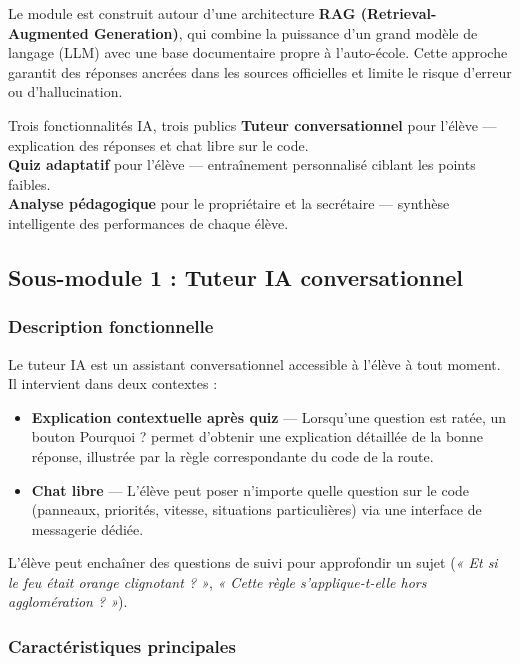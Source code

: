 \documentclass[12pt,a4paper]{article}
\newcommand{\highlight}[1]{\textbf{\color{primary}#1}}
\begin{document}
Le module est construit autour d'une architecture \highlight{RAG (Retrieval-Augmented Generation)}, qui combine la puissance d'un grand modèle de langage (LLM) avec une base documentaire propre à l'auto-école. Cette approche garantit des réponses ancrées dans les sources officielles et limite le risque d'erreur ou d'hallucination.

\begin{infobox}{Trois fonctionnalités IA, trois publics}
\textbf{Tuteur conversationnel} pour l'élève --- explication des réponses et chat libre sur le code. \\
\textbf{Quiz adaptatif} pour l'élève --- entraînement personnalisé ciblant les points faibles. \\
\textbf{Analyse pédagogique} pour le propriétaire et la secrétaire --- synthèse intelligente des performances de chaque élève.
\end{infobox}

\subsection{Sous-module 1 : Tuteur IA conversationnel}

\subsubsection{Description fonctionnelle}

Le tuteur IA est un assistant conversationnel accessible à l'élève à tout moment. Il intervient dans deux contextes :

\begin{itemize}[leftmargin=*,itemsep=4pt]
    \item \textbf{Explication contextuelle après quiz} --- Lorsqu'une question est ratée, un bouton \og Pourquoi ? \fg{} permet d'obtenir une explication détaillée de la bonne réponse, illustrée par la règle correspondante du code de la route.
    \item \textbf{Chat libre} --- L'élève peut poser n'importe quelle question sur le code (panneaux, priorités, vitesse, situations particulières) via une interface de messagerie dédiée.
\end{itemize}

L'élève peut enchaîner des questions de suivi pour approfondir un sujet (\textit{« Et si le feu était orange clignotant ? »}, \textit{« Cette règle s'applique-t-elle hors agglomération ? »}).

\subsubsection{Caractéristiques principales}
\end{document}
